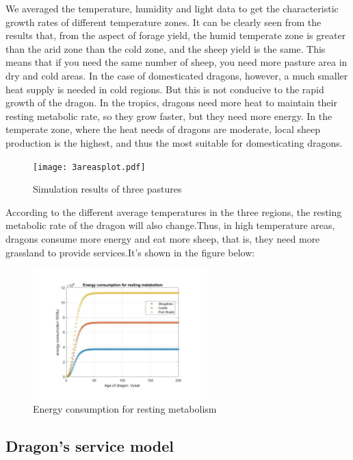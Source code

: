 \documentclass[12pt]{article}  %
\begin{document}
We averaged the temperature, humidity and light data to get the characteristic growth rates of different temperature zones. It can be clearly seen from the results that, from the aspect of forage yield, the humid temperate zone is greater than the arid zone than the cold zone, and the sheep yield is the same. This means that if you need the same number of sheep, you need more pasture area in dry and cold areas. In the case of domesticated dragons, however, a much smaller heat supply is needed in cold regions. But this is not conducive to the rapid growth of the dragon. In the tropics, dragons need more heat to maintain their resting metabolic rate, so they grow faster, but they need more energy. In the temperate zone, where the heat needs of dragons are moderate, local sheep production is the highest, and thus the most suitable for domesticating dragons.
 \newpage
\vspace{-0.3cm}
\begin{figure}[htbp]
	\centering
	\texttt{[image: 3areasplot.pdf]}
	\caption{Simulation results of three pastures}\label{fig:work1}
\end{figure}
\vspace{0.3cm}
 According to the different average temperatures in the three regions, the resting metabolic rate of the dragon will also change.Thus, in high temperature areas, dragons consume more energy and eat more sheep, that is, they need more grassland to provide services.It's shown in the figure below:

\vspace{-0.3cm}
\begin{figure}[h]
	\centering
	\includegraphics[width=0.6\textwidth]{easymcm/img/abcd.pdf}
	\caption{Energy consumption for resting metabolism}
\end{figure}
\vspace{-0.3cm}

\subsection{Dragon's service model}
\end{document}
